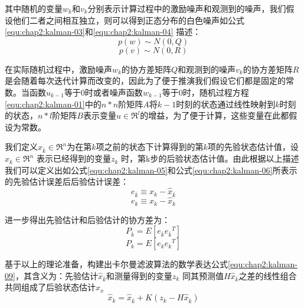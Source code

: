\par 其中随机的变量$w_{k}$和$v_{k}$分别表示计算过程中的激励噪声和观测到的噪声，我们假设他们二者之间相互独立，则可以得到正态分布的白色噪声如公式\ref{equ:chap2:kalman-03}和\ref{equ:chap2:kalman-04} 描述：
\begin{equation}
\label{equ:chap2:kalman-03}
  p(w)\sim N(0,Q)
\end{equation}
\begin{equation}
\label{equ:chap2:kalman-04}
  p(v)\sim N(0,R)
\end{equation}
\par 在实际随机过程中，激励噪声$w_{k}$的协方差矩阵$Q$和观测到的噪声$v_{k}$的协方差矩阵$R$是会随着每次迭代计算而改变的，因此为了便于推演我们假设它们都是固定的常数。当函数$u_{k-1}$等于0时或者噪声函数$w_{k-1}$等于0时，随机过程方程\ref{equ:chap2:kalman-01}中的$n*n$阶矩阵$A$将$k-1$时刻的状态通过线性映射到$k$时刻的状态，$n*l$阶矩阵$B$表示变量$u\in \Re^{l}$的增益，为了便于计算，这些变量在此都假设为常数。
\par 我们定义$\hat{x}_{\bar{k}} \in \Re^{n}$为在第$k$项之前的状态下计算得到的第$k$项的先验状态估计值，设$\hat{x}_{k} \in \Re^{n}$ 表示已经得到的变量$z_{k}$ 时，第k步的后验状态估计值。由此根据以上描述我们可以定义出如公式\ref{equ:chap2:kalman-05}和公式\ref{equ:chap2:kalman-06}所表示的先验估计误差后后验估计误差：
\begin{equation}
\label{equ:chap2:kalman-05}
  e_{\bar{k}}\equiv x_{k}-\hat{x}_{\bar{k}}
\end{equation}
\begin{equation}
\label{equ:chap2:kalman-06}
  e_{k}\equiv x_{k}-\hat{x}_{k}
\end{equation}
\par 进一步得出先验估计和后验估计的协方差为：
\begin{equation}
\label{equ:chap2:kalman-07}
P_{\bar{k}}=E\left [ e_{\bar{k}} {e_{\bar{k}}}^{T}  \right ]
\end{equation}
\begin{equation}
\label{equ:chap2:kalman-08}
P_{k}=E\left [ e_{k} {e_{k}}^{T}  \right ]
\end{equation}
\par 基于以上的理论准备，构建出卡尔曼滤波算法的数学表达公式\ref{equ:chap2:kalman-09}，其含义为：先验估计$\hat{x}_{\bar{k}}$和测量得到的变量$z_{k}$ 同其预测值$H\hat{x}_{\bar{k}}$之差的线性组合共同组成了后验状态估计$\hat{x}_{x}$
\begin{equation}
\label{equ:chap2:kalman-09}
\hat{x}_{k}=\hat{x}_{\bar{k}} + K(z_{k}-H\hat{x}_{\bar{k}})
\end{equation}
